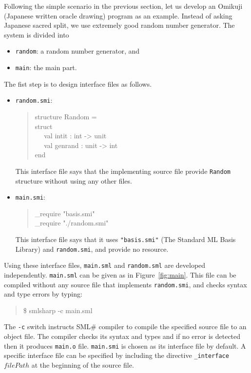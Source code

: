 \documentclass{jbook}
\newcommand{\smlsharp}{SML\#}
\newcommand{\myem}{\mbox{\ \ }}
\newenvironment{program}{\begin{quote}\begin{tt}}%
                        {\end{tt}\end{quote}}
\begin{document}
\else%
	Following the simple scenario in the previous section, let us
develop an Omikuji (Japanese written oracle drawing) program as an example.
	Instead of asking Japanese sacred split, we use extremely good
random number generator.
	The system is divided into
\begin{itemize}
\item {\tt random}: a random number generator, and
\item {\tt main}: the main part.
\end{itemize}
	The fist step is to design interface files as follows.
\begin{itemize}
\item {\tt random.smi}:
\begin{program}
structure Random =
\\
struct
\\\myem
  val intit : int -> unit
\\\myem
  val genrand : unit -> int
\\
end
\end{program}
	This interface file says that the implementing source file provide
{\tt Random} structure without using any other files.
\item {\tt main.smi}:
\begin{program}
\_require "basis.smi"\\
\_require "./random.smi"
\end{program}
	This interface file says that it uses  {\tt "basis.smi"} (The
Standard ML Basis Library) and {\tt random.smi}, and provide no resource.
\end{itemize}

	Using these interface files, {\tt main.sml} and {\tt random.sml}
are developed independently.
	{\tt main.sml} can be given as in Figure~\ref{fig:main}.
	This file can be compiled without any source file that implements
{\tt random.smi}, and checks syntax and type errors by typing:
\begin{program}
\$ smlsharp -c main.sml
\end{program}
	The {\tt -c} switch instructs \smlsharp{} compiler
to compile the specified source file to an object file.
	The compiler checks its syntax and types and if no error is
detected then it produces {\tt main.o} file.
	{\tt main.smi} is chosen as its interface file by default.
	A specific interface file can be specified by including the
directive {\tt \_interface $filePath$} at the beginning of the source
file.
\end{document}
